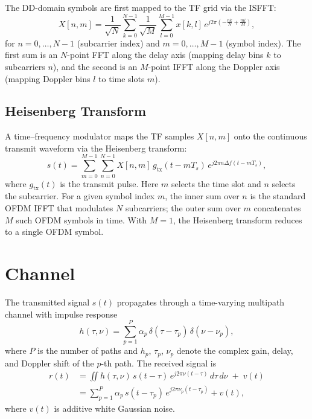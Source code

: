 \documentclass[11pt,a4paper]{article}
\newcommand{\deltaf}{\Delta f}
\begin{document}
The DD-domain symbols are first mapped to the TF grid via the ISFFT:
\begin{equation}
  X[n,m] = \frac{1}{\sqrt{N}}\sum_{k=0}^{N-1}
  \frac{1}{\sqrt{M}}\sum_{l=0}^{M-1}
  x[k,l]\,e^{j2\pi\!\left(-\frac{nk}{N}+\frac{ml}{M}\right)},
  \label{eq:isfft}
\end{equation}
for $n=0,\dots,N-1$ (subcarrier index) and $m=0,\dots,M-1$ (symbol
index). The first sum is an $N$-point FFT along the delay axis
(mapping delay bins $k$ to subcarriers $n$), and the second is an
$M$-point IFFT along the Doppler axis (mapping Doppler bins $l$ to
time slots $m$).

\subsection{Heisenberg Transform}

A time--frequency modulator maps the TF samples $X[n,m]$ onto the
continuous transmit waveform via the Heisenberg transform:
\begin{equation}
  s(t) = \sum_{m=0}^{M-1}\sum_{n=0}^{N-1}
  X[n,m]\,g_{\mathrm{tx}}(t-mT_s)\,e^{j2\pi n\deltaf(t-mT_s)},
  \label{eq:heisenberg}
\end{equation}
where $g_{\mathrm{tx}}(t)$ is the transmit pulse. Here $m$ selects the
time slot and $n$ selects the subcarrier. For a given symbol index $m$,
the inner sum over $n$ is the standard OFDM IFFT that modulates $N$
subcarriers; the outer sum over $m$ concatenates $M$ such OFDM symbols
in time. With $M=1$, the Heisenberg transform reduces to a single OFDM
symbol.

\section{Channel}

The transmitted signal $s(t)$ propagates through a time-varying
multipath channel with impulse response
\begin{equation}
  h(\tau,\nu) = \sum_{p=1}^{P} \alpha_p\,\delta(\tau-\tau_p)\,\delta(\nu-\nu_p),
  \label{eq:channel_dd}
\end{equation}
where $P$ is the number of paths and $h_p$, $\tau_p$, $\nu_p$ denote
the complex gain, delay, and Doppler shift of the $p$-th path.
The received signal is
\begin{align}
  r(t) &= \iint h(\tau,\nu)\,s(t-\tau)\,e^{j2\pi\nu(t-\tau)}\,d\tau\,d\nu
  \;+\; v(t)\\
  &= \sum_{p=1}^{P} \alpha_p\,s(t-\tau_p)\,e^{j2\pi\nu_p(t-\tau_p)} + v(t),
  \label{eq:rx_cont}
\end{align}
where $v(t)$ is additive white Gaussian noise.
\end{document}
